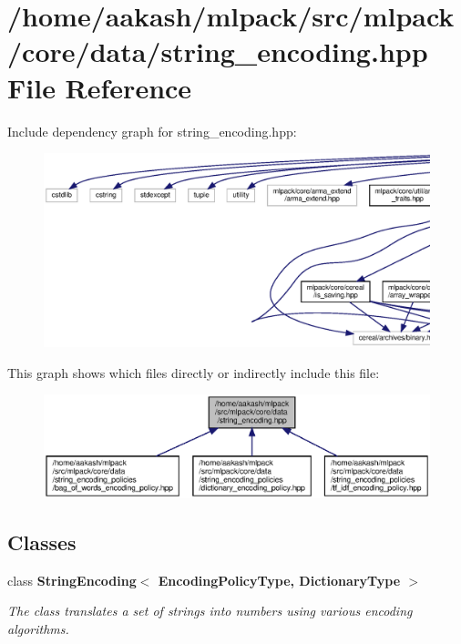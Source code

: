 \section{/home/aakash/mlpack/src/mlpack/core/data/string\+\_\+encoding.hpp File Reference}
\label{string__encoding_8hpp}
Include dependency graph for string\+\_\+encoding.\+hpp\+:
\nopagebreak
\begin{figure}[H]
\begin{center}
\leavevmode
\includegraphics[width=350pt]{string__encoding_8hpp__incl}
\end{center}
\end{figure}
This graph shows which files directly or indirectly include this file\+:
\nopagebreak
\begin{figure}[H]
\begin{center}
\leavevmode
\includegraphics[width=350pt]{string__encoding_8hpp__dep__incl}
\end{center}
\end{figure}
\subsection*{Classes}
\begin{DoxyCompactItemize}
\item 
class \textbf{ String\+Encoding$<$ Encoding\+Policy\+Type, Dictionary\+Type $>$}
\begin{DoxyCompactList}\small\item\em The class translates a set of strings into numbers using various encoding algorithms. \end{DoxyCompactList}\end{DoxyCompactItemize}
